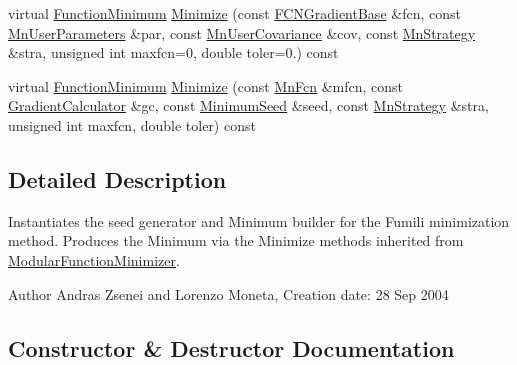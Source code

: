 \begin{DoxyCompactItemize}
\item 
virtual \mbox{\hyperlink{classROOT_1_1Minuit2_1_1FunctionMinimum}{Function\+Minimum}} \mbox{\hyperlink{classROOT_1_1Minuit2_1_1FumiliMinimizer_adb2739d40e10cce1923e5a21dac3f420}{Minimize}} (const \mbox{\hyperlink{classROOT_1_1Minuit2_1_1FCNGradientBase}{F\+C\+N\+Gradient\+Base}} \&fcn, const \mbox{\hyperlink{classROOT_1_1Minuit2_1_1MnUserParameters}{Mn\+User\+Parameters}} \&par, const \mbox{\hyperlink{classROOT_1_1Minuit2_1_1MnUserCovariance}{Mn\+User\+Covariance}} \&cov, const \mbox{\hyperlink{classROOT_1_1Minuit2_1_1MnStrategy}{Mn\+Strategy}} \&stra, unsigned int maxfcn=0, double toler=0.) const
\item 
virtual \mbox{\hyperlink{classROOT_1_1Minuit2_1_1FunctionMinimum}{Function\+Minimum}} \mbox{\hyperlink{classROOT_1_1Minuit2_1_1FumiliMinimizer_ace396e586a17ad934f18b32c8ddd054a}{Minimize}} (const \mbox{\hyperlink{classROOT_1_1Minuit2_1_1MnFcn}{Mn\+Fcn}} \&mfcn, const \mbox{\hyperlink{classROOT_1_1Minuit2_1_1GradientCalculator}{Gradient\+Calculator}} \&gc, const \mbox{\hyperlink{classROOT_1_1Minuit2_1_1MinimumSeed}{Minimum\+Seed}} \&seed, const \mbox{\hyperlink{classROOT_1_1Minuit2_1_1MnStrategy}{Mn\+Strategy}} \&stra, unsigned int maxfcn, double toler) const
\end{DoxyCompactItemize}


\subsection{Detailed Description}
Instantiates the seed generator and Minimum builder for the Fumili minimization method. Produces the Minimum via the Minimize methods inherited from \mbox{\hyperlink{classROOT_1_1Minuit2_1_1ModularFunctionMinimizer}{Modular\+Function\+Minimizer}}.

\begin{DoxyAuthor}{Author}
Andras Zsenei and Lorenzo Moneta, Creation date\+: 28 Sep 2004 
\end{DoxyAuthor}


\subsection{Constructor \& Destructor Documentation}
\mbox{\label{classROOT_1_1Minuit2_1_1FumiliMinimizer_af33036073afd0161dbe9fd2fe0866575}} 
